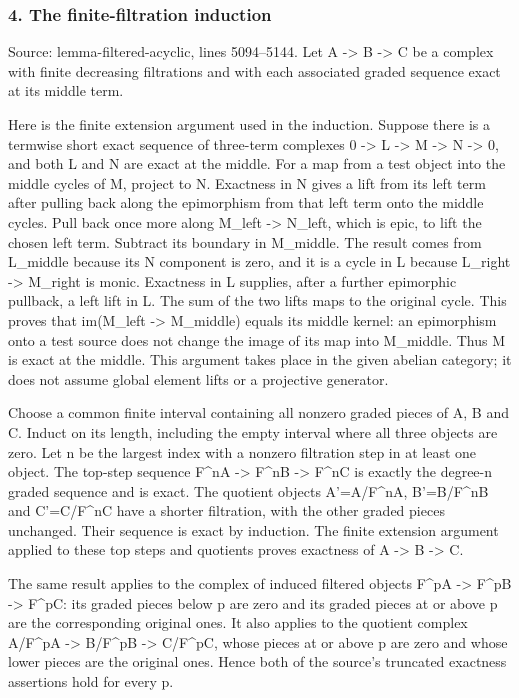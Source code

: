 \documentclass[11pt]{article}
\begin{document}
\subsubsection{4. The finite-filtration induction}\label{the-finite-filtration-induction}

Source: lemma-filtered-acyclic, lines 5094--5144. Let A -\textgreater{} B -\textgreater{} C be a complex with finite decreasing filtrations and with each associated graded sequence exact at its middle term.

Here is the finite extension argument used in the induction. Suppose there is a termwise short exact sequence of three-term complexes 0 -\textgreater{} L -\textgreater{} M -\textgreater{} N -\textgreater{} 0, and both L and N are exact at the middle. For a map from a test object into the middle cycles of M, project to N. Exactness in N gives a lift from its left term after pulling back along the epimorphism from that left term onto the middle cycles. Pull back once more along M\_left -\textgreater{} N\_left, which is epic, to lift the chosen left term. Subtract its boundary in M\_middle. The result comes from L\_middle because its N component is zero, and it is a cycle in L because L\_right -\textgreater{} M\_right is monic. Exactness in L supplies, after a further epimorphic pullback, a left lift in L. The sum of the two lifts maps to the original cycle. This proves that im(M\_left -\textgreater{} M\_middle) equals its middle kernel: an epimorphism onto a test source does not change the image of its map into M\_middle. Thus M is exact at the middle. This argument takes place in the given abelian category; it does not assume global element lifts or a projective generator.

Choose a common finite interval containing all nonzero graded pieces of A, B and C. Induct on its length, including the empty interval where all three objects are zero. Let n be the largest index with a nonzero filtration step in at least one object. The top-step sequence F\^{}nA -\textgreater{} F\^{}nB -\textgreater{} F\^{}nC is exactly the degree-n graded sequence and is exact. The quotient objects A'=A/F\^{}nA, B'=B/F\^{}nB and C'=C/F\^{}nC have a shorter filtration, with the other graded pieces unchanged. Their sequence is exact by induction. The finite extension argument applied to these top steps and quotients proves exactness of A -\textgreater{} B -\textgreater{} C.

The same result applies to the complex of induced filtered objects F\^{}pA -\textgreater{} F\^{}pB -\textgreater{} F\^{}pC: its graded pieces below p are zero and its graded pieces at or above p are the corresponding original ones. It also applies to the quotient complex A/F\^{}pA -\textgreater{} B/F\^{}pB -\textgreater{} C/F\^{}pC, whose pieces at or above p are zero and whose lower pieces are the original ones. Hence both of the source's truncated exactness assertions hold for every p.
\end{document}
